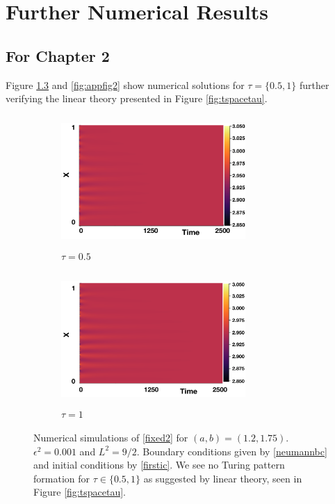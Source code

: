 \chapter{Further Numerical Results}\label{section:appB}

\section{For Chapter 2}\label{section:Bfix}

Figure \ref{fig:appfig1} and \ref{fig:appfig2} show numerical solutions for $\tau=\{0.5,1\}$ further verifying the linear theory presented in Figure \ref{fig:tspacetau}.

\begin{figure}[H]
  \centering
\begin{subfigure}[t]{0.45\textwidth}
    \centering
    \includegraphics[width=7cm,height=5cm]{p3t05.png}
    \caption{$\tau=0.5$}
    \label{}
\end{subfigure}
\hfill
\begin{subfigure}[t]{0.45\textwidth}
    \centering
    \includegraphics[width=7cm,height=5cm]{p3t1.png}
    \caption{$\tau=1$}
    \label{}
\end{subfigure}
\caption{Numerical simulations of \eqref{fixed2} for $(a,b)=(1.2,1.75)$. $\epsilon^2=0.001$ and $L^2=9/2$. Boundary conditions given by \eqref{neumannbc} and initial conditions by \eqref{firstic}. We see no Turing pattern formation for $\tau\in\{0.5,1\}$ as suggested by linear theory, seen in Figure \ref{fig:tspacetau}. }
\label{fig:appfig1}
\end{figure}
